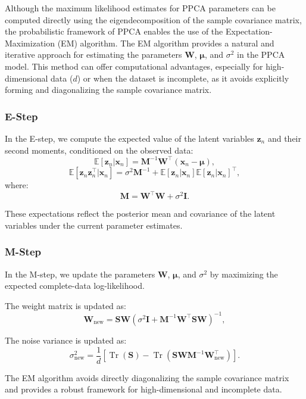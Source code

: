 \documentclass{article}
\begin{document}
Although the maximum likelihood estimates for PPCA parameters can be computed directly using the eigendecomposition of the sample covariance matrix, the probabilistic framework of PPCA enables the use of the Expectation-Maximization (EM) algorithm. The EM algorithm provides a natural and iterative approach for estimating the parameters \(\mathbf{W}\), \(\boldsymbol{\mu}\), and \(\sigma^2\) in the PPCA model. This method can offer computational advantages, especially for high-dimensional data (\(d\)) or when the dataset is incomplete, as it avoids explicitly forming and diagonalizing the sample covariance matrix.

\subsubsection{E-Step}

In the E-step, we compute the expected value of the latent variables \(\mathbf{z}_n\) and their second moments, conditioned on the observed data:
\[
\mathbb{E}[\mathbf{z}_n | \mathbf{x}_n] = \mathbf{M}^{-1} \mathbf{W}^\top (\mathbf{x}_n - \boldsymbol{\mu}),
\]
\[
\mathbb{E}[\mathbf{z}_n \mathbf{z}_n^\top | \mathbf{x}_n] = \sigma^2 \mathbf{M}^{-1} + \mathbb{E}[\mathbf{z}_n | \mathbf{x}_n] \mathbb{E}[\mathbf{z}_n | \mathbf{x}_n]^\top,
\]
where:
\[
\mathbf{M} = \mathbf{W}^\top \mathbf{W} + \sigma^2 \mathbf{I}.
\]

These expectations reflect the posterior mean and covariance of the latent variables under the current parameter estimates.

\subsubsection{M-Step}
In the M-step, we update the parameters \(\mathbf{W}\), \(\boldsymbol{\mu}\), and \(\sigma^2\) by maximizing the expected complete-data log-likelihood.

The weight matrix is updated as:
\[
\mathbf{W}_{\text{new}} = \mathbf{S} \mathbf{W} (\sigma^2 \mathbf{I} + \mathbf{M}^{-1} \mathbf{W}^\top \mathbf{S} \mathbf{W})^{-1},
\]

The noise variance is updated as:
\[
\sigma^2_{\text{new}} = \frac{1}{d} \left[ \operatorname{Tr}(\mathbf{S}) - \operatorname{Tr}(\mathbf{S} \mathbf{W} \mathbf{M}^{-1} \mathbf{W}_{\text{new}}^\top) \right].
\]

The EM algorithm avoids directly diagonalizing the sample covariance matrix and provides a robust framework for high-dimensional and incomplete data.
\end{document}
